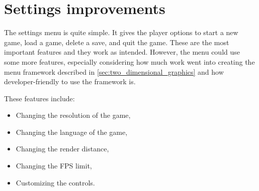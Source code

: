 \section{Settings improvements}
The settings menu is quite simple.
It gives the player options to start a new game, load a game, delete a save, and quit the game.
These are the most important features and they work as intended.
However, the menu could use some more features, especially considering how much work went into creating the menu framework described in \autoref{sec:two_dimensional_graphics} and how developer-friendly to use the framework is.

These features include:
\begin{itemize}
    \item Changing the resolution of the game,
    \item Changing the language of the game,
    \item Changing the render distance,
    \item Changing the FPS limit,
    \item Customizing the controls.
\end{itemize}